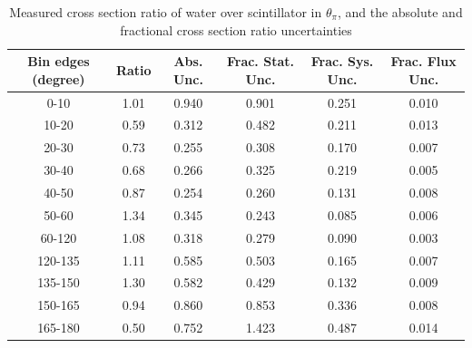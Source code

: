 \documentclass[../main.tex]{subfiles}
\begin{document}
\begin{table}
  \centering
  \renewcommand{\arraystretch}{1.15}
  \caption{Measured cross section ratio of water over scintillator in $\theta_{\pi}$, and the absolute and fractional cross section ratio uncertainties}
    \begin{tabular}{c||c|c||c|c|c}
      Bin edges (degree) &  Ratio  &  Abs. Unc.  &  Frac. Stat. Unc.  &  Frac. Sys. Unc.  &  Frac. Flux Unc. \\
      \hline
      \hline
      0-10 & 1.01 & 0.940 & 0.901 & 0.251 & 0.010\\
      10-20 & 0.59 & 0.312 & 0.482 & 0.211 & 0.013\\
      20-30 & 0.73 & 0.255 & 0.308 & 0.170 & 0.007\\
      30-40 & 0.68 & 0.266 & 0.325 & 0.219 & 0.005\\
      40-50 & 0.87 & 0.254 & 0.260 & 0.131 & 0.008\\
      50-60 & 1.34 & 0.345 & 0.243 & 0.085 & 0.006\\
      60-120 & 1.08 & 0.318 & 0.279 & 0.090 & 0.003\\
      120-135 & 1.11 & 0.585 & 0.503 & 0.165 & 0.007\\
      135-150 & 1.30 & 0.582 & 0.429 & 0.132 & 0.009\\
      150-165 & 0.94 & 0.860 & 0.853 & 0.336 & 0.008\\
      165-180 & 0.50 & 0.752 & 1.423 & 0.487 & 0.014
    \end{tabular}
  \label{tbl:rationucleonnuc10pion_thetaa}
\end{table}
\pagebreak
\end{document}

